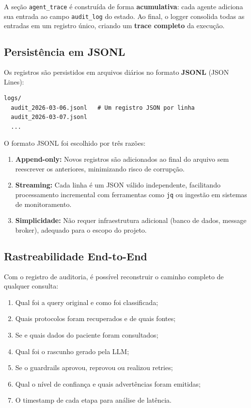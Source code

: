 A seção \texttt{agent\_trace} é construída de forma \textbf{acumulativa}: cada agente adiciona sua entrada ao campo \texttt{audit\_log} do estado. Ao final, o logger consolida todas as entradas em um registro único, criando um \textbf{trace completo} da execução.

\subsection{Persistência em JSONL}

Os registros são persistidos em arquivos diários no formato \textbf{JSONL} (JSON Lines):

\begin{lstlisting}[style=bash,caption={Estrutura de persistência dos logs de auditoria.}]
logs/
  audit_2026-03-06.jsonl   # Um registro JSON por linha
  audit_2026-03-07.jsonl
  ...
\end{lstlisting}

O formato JSONL foi escolhido por três razões:

\begin{enumerate}
    \item \textbf{Append-only:} Novos registros são adicionados ao final do arquivo sem reescrever os anteriores, minimizando risco de corrupção.
    \item \textbf{Streaming:} Cada linha é um JSON válido independente, facilitando processamento incremental com ferramentas como \texttt{jq} ou ingestão em sistemas de monitoramento.
    \item \textbf{Simplicidade:} Não requer infraestrutura adicional (banco de dados, message broker), adequado para o escopo do projeto.
\end{enumerate}

\subsection{Rastreabilidade End-to-End}

Com o registro de auditoria, é possível reconstruir o caminho completo de qualquer consulta:

\begin{enumerate}
    \item Qual foi a query original e como foi classificada;
    \item Quais protocolos foram recuperados e de quais fontes;
    \item Se e quais dados do paciente foram consultados;
    \item Qual foi o rascunho gerado pela LLM;
    \item Se o guardrails aprovou, reprovou ou realizou retries;
    \item Qual o nível de confiança e quais advertências foram emitidas;
    \item O timestamp de cada etapa para análise de latência.
\end{enumerate}

